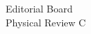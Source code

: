 \documentclass{letter} %
\begin{document}
\begin{letter}{
Editorial Board \\
Physical Review C}













\end{letter}
\end{document}
